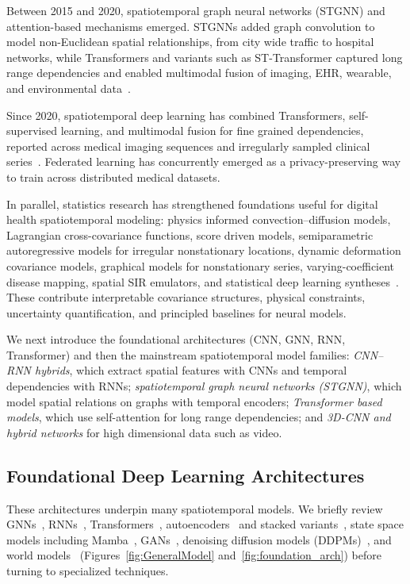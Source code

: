 \documentclass[journal]{IEEEtran}
\begin{document}
Between 2015 and 2020, spatiotemporal graph neural networks (STGNN) and attention-based mechanisms emerged. STGNNs added graph convolution to model non-Euclidean spatial relationships, from city wide traffic to hospital networks, while Transformers and variants such as ST-Transformer captured long range dependencies and enabled multimodal fusion of imaging, EHR, wearable, and environmental data~\cite{caroprese2018deepehr}.

Since 2020, spatiotemporal deep learning has combined Transformers, self-supervised learning, and multimodal fusion for fine grained dependencies, reported across medical imaging sequences and irregularly sampled clinical series~\cite{sun2026irregularmedical}. Federated learning has concurrently emerged as a privacy-preserving way to train across distributed medical datasets.

In parallel, statistics research has strengthened foundations useful for digital health spatiotemporal modeling: physics informed convection--diffusion models, Lagrangian cross-covariance functions, score driven models, semiparametric autoregressive models for irregular nonstationary locations, dynamic deformation covariance models, graphical models for nonstationary series, varying-coefficient disease mapping, spatial SIR emulators, and statistical deep learning syntheses~\cite{liu2022convectionDiffusion,salvana2023lagrangian,gasperoni2023scoreDriven,lu2024dyfast,castroMorales2025dynamicDeformation,basu2023graphicalNonstationary,wang2024respiratoryDiseaseMapping,trostle2024spatialSIR,wikle2023statisticalDeepLearning}. These contribute interpretable covariance structures, physical constraints, uncertainty quantification, and principled baselines for neural models.

We next introduce the foundational architectures (CNN, GNN, RNN, Transformer) and then the mainstream spatiotemporal model families: \emph{CNN--RNN hybrids}, which extract spatial features with CNNs and temporal dependencies with RNNs; \emph{spatiotemporal graph neural networks (STGNN)}, which model spatial relations on graphs with temporal encoders; \emph{Transformer based models}, which use self-attention for long range dependencies; and \emph{3D-CNN and hybrid networks} for high dimensional data such as video.


\subsection{Foundational Deep Learning Architectures }
These architectures underpin many spatiotemporal models. We briefly review GNNs~\cite{scarselli2009gnn}, RNNs~\cite{rumelhart1986rnn}, Transformers~\cite{vaswani2017attention}, autoencoders~\cite{hinton2006reducing} and stacked variants~\cite{masci2011stacked}, state space models including Mamba~\cite{gu2023mamba}, GANs~\cite{goodfellow2014gan}, denoising diffusion models (DDPMs)~\cite{ho2020ddpm}, and world models~\cite{maes2026leworldmodel} (Figures~\ref{fig:GeneralModel} and~\ref{fig:foundation_arch}) before turning to specialized techniques.
\end{document}
